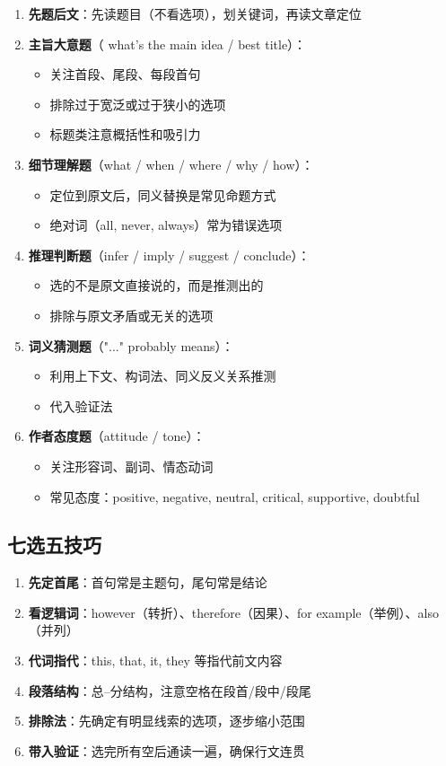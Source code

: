 \begin{enumerate}
  \item \textbf{先题后文}：先读题目（不看选项），划关键词，再读文章定位
  \item \textbf{主旨大意题}（ what's the main idea / best title）：
    \begin{itemize}
      \item 关注首段、尾段、每段首句
      \item 排除过于宽泛或过于狭小的选项
      \item 标题类注意概括性和吸引力
    \end{itemize}
  \item \textbf{细节理解题}（what / when / where / why / how）：
    \begin{itemize}
      \item 定位到原文后，同义替换是常见命题方式
      \item 绝对词（all, never, always）常为错误选项
    \end{itemize}
  \item \textbf{推理判断题}（infer / imply / suggest / conclude）：
    \begin{itemize}
      \item 选的不是原文直接说的，而是推测出的
      \item 排除与原文矛盾或无关的选项
    \end{itemize}
  \item \textbf{词义猜测题}（"..." probably means）：
    \begin{itemize}
      \item 利用上下文、构词法、同义反义关系推测
      \item 代入验证法
    \end{itemize}
  \item \textbf{作者态度题}（attitude / tone）：
    \begin{itemize}
      \item 关注形容词、副词、情态动词
      \item 常见态度：positive, negative, neutral, critical, supportive, doubtful
    \end{itemize}
\end{enumerate}

\subsection{七选五技巧}

\begin{enumerate}
  \item \textbf{先定首尾}：首句常是主题句，尾句常是结论
  \item \textbf{看逻辑词}：however（转折）、therefore（因果）、for example（举例）、also（并列）
  \item \textbf{代词指代}：this, that, it, they 等指代前文内容
  \item \textbf{段落结构}：总--分结构，注意空格在段首/段中/段尾
  \item \textbf{排除法}：先确定有明显线索的选项，逐步缩小范围
  \item \textbf{带入验证}：选完所有空后通读一遍，确保行文连贯
\end{enumerate}

